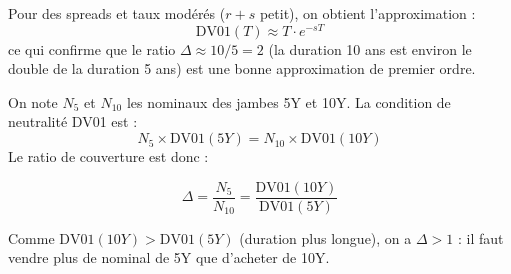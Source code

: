 Pour des spreads et taux modérés ($r+s$ petit), on obtient l'approximation :\[
\mathrm{DV01}(T) \approx T \cdot e^{-sT}
\]
ce qui confirme que le ratio $\Delta \approx 10/5 = 2$ (la duration 10 ans est environ le double de la duration 5 ans) est une bonne approximation de premier ordre.

\begin{definition}
On note $N_5$ et $N_{10}$ les nominaux des jambes 5Y et 10Y. La condition de neutralité DV01 est :
\[
N_5 \times \mathrm{DV01}(5Y) = N_{10} \times \mathrm{DV01}(10Y)
\]
Le ratio de couverture est donc :
\begin{tcolorbox}[colback=blue!5,colframe=blue!40]
\[
\Delta = \frac{N_5}{N_{10}} = \frac{\mathrm{DV01}(10Y)}{\mathrm{DV01}(5Y)}
\]
\end{tcolorbox}
Comme $\mathrm{DV01}(10Y) > \mathrm{DV01}(5Y)$ (duration plus longue), on a $\Delta > 1$ : il faut vendre plus de nominal de 5Y que d'acheter de 10Y.
\end{definition}

